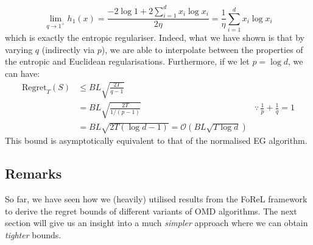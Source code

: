 \begin{equation}
    \lim_{q \to 1^+} h_1(x) = \frac{-2 \log 1 + 2 \sum_{i=1}^d x_i \log x_i}{2 \eta} = \frac{1}{\eta} \sum_{i=1}^d x_i \log x_i
\end{equation} which is exactly the entropic regulariser. Indeed, what we have shown is that by varying $q$ (indirectly via $p$), we are able to interpolate between the properties of the entropic and Euclidean regularisations. Furthermore, if we let $p = \log d$, we can have: \begin{align*}
    \text{Regret}_T(S) &\leq BL \sqrt{\frac{2T}{q-1}}\\
    &= BL \sqrt{\frac{2T}{1/(p-1)}} &\because \,\frac{1}{p} + \frac{1}{q} = 1\\
    &= BL \sqrt{2T(\log d - 1)} = \mathcal{O}(BL\sqrt{T\log d})
\end{align*}
This bound is asymptotically equivalent to that of the normalised EG algorithm.
\subsection{Remarks}
So far, we have seen how we (heavily) utilised results from the FoReL framework to derive the regret bounds of different variants of OMD algorithms. The next section will give us an insight into a much \textit{simpler} approach where we can obtain \textit{tighter} bounds.
